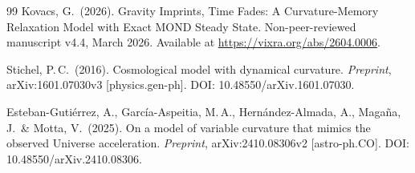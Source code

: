 \documentclass[aps,prd,twocolumn,superscriptaddress,nofootinbib]{revtex4-2}
\begin{document}
\begin{thebibliography}{99}
Kovacs, G.\ (2026).
Gravity Imprints, Time Fades: A Curvature-Memory Relaxation Model with Exact MOND Steady State.
Non-peer-reviewed manuscript v4.4, March 2026.
Available at \url{https://vixra.org/abs/2604.0006}.

Stichel, P.\,C.\ (2016).
Cosmological model with dynamical curvature.
\textit{Preprint}, arXiv:1601.07030v3 [physics.gen-ph].
DOI: 10.48550/arXiv.1601.07030.

Esteban-Guti\'errez, A., Garc\'ia-Aspeitia, M.\,A., Hern\'andez-Almada, A., Maga\~na, J.\ \& Motta, V.\ (2025).
On a model of variable curvature that mimics the observed Universe acceleration.
\textit{Preprint}, arXiv:2410.08306v2 [astro-ph.CO].
DOI: 10.48550/arXiv.2410.08306.

\end{thebibliography}
\end{document}
